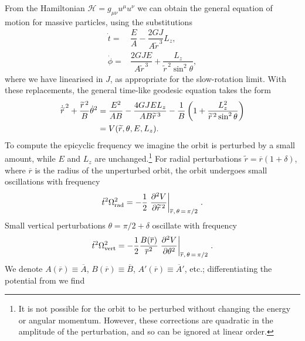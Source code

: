 From the Hamiltonian $\mathcal{H} = g_{\mu\nu}u^\mu u^\nu$ we can obtain the general equation of motion for massive particles, using the substitutions
\begin{align}
\dot{t} = {} & \dfrac{E}{A} -\dfrac{2GJ}{A\widetilde{r}^{\,3}}L_z, \\
\dot{\phi} = {} &  \dfrac{2GJE}{A\widetilde{r}^{\,3}} + \dfrac{L_z}{\widetilde{r}^{\,2} \sin^2\theta},
\end{align}
where we have linearised in $J$, as appropriate for the slow-rotation limit. With these replacements, the general time-like geodesic equation takes the form
\begin{align}
\dot{\widetilde{r}}^{\,2} + \dfrac{\widetilde{r}^{\,2}}{B} \dot{\theta}^2 = {} & \dfrac{E^2}{AB} -\dfrac{4GJEL_z}{AB \widetilde{r}^{\,3}}- \dfrac{1}{B}\left(1 + \dfrac{L_z^2}{\widetilde{r}^{\,2}\sin^2\theta}\right) \nonumber \\*
 = {} & V(\widetilde{r},\theta,E,L_z).
\label{eq:rdot}
\end{align}
To compute the epicyclic frequency we imagine the orbit is perturbed by a small amount, while $E$ and $L_z$ are unchanged.\footnote{It is not possible for the orbit to be perturbed without changing the energy or angular momentum. However, these corrections are quadratic in the amplitude of the perturbation, and so can be ignored at linear order.} For radial perturbations $\widetilde{r} = \overline{r}(1 + \delta)$, where $\overline{r}$ is the radius of the unperturbed orbit, the orbit undergoes small oscillations with frequency
\begin{equation}
\dot{t}^2\Omega_\mathrm{rad}^2 = -\dfrac{1}{2} \left. \dfrac{\partial {^2 V}}{\partial {\widetilde{r}^{\,2}}}\right|_{\overline{r},\,\theta\,=\,\pi/2\,}.
\end{equation}
Small vertical perturbations $\theta = \pi/2 + \delta$ oscillate with frequency
\begin{equation}
\dot{t}^2\Omega_\mathrm{vert}^2 = -\dfrac{1}{2} \dfrac{B(\overline{r})}{\overline{r}^2} \left. \dfrac{\partial {^2 V}}{\partial {\theta^2}}\right|_{\overline{r},\,\theta\,=\,\pi/2\,}.
\end{equation}
We denote $A(\overline{r}) \equiv \overline{A}$, $B(\overline{r}) \equiv \overline{B}$, $A'(\overline{r}) \equiv \overline{A}'$, etc.; differentiating the potential from  we find \citep{Berry2011}
